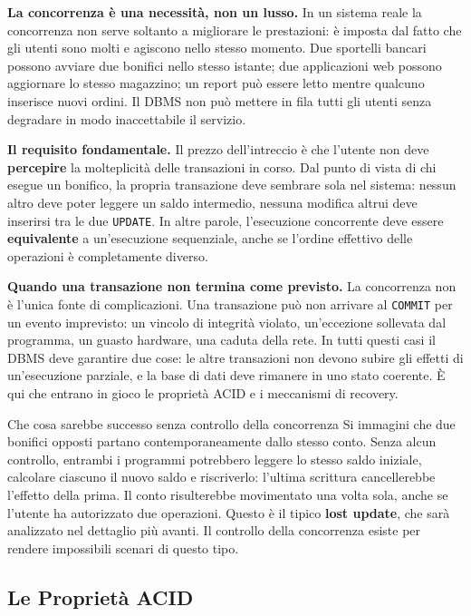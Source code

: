 \documentclass[12pt]{extarticle}
\begin{document}
\medskip
\noindent \textbf{La concorrenza è una necessità, non un lusso.} In un sistema reale la concorrenza non serve soltanto a migliorare le prestazioni: è imposta dal fatto che gli utenti sono molti e agiscono nello stesso momento. Due sportelli bancari possono avviare due bonifici nello stesso istante; due applicazioni web possono aggiornare lo stesso magazzino; un report può essere letto mentre qualcuno inserisce nuovi ordini. Il DBMS non può mettere in fila tutti gli utenti senza degradare in modo inaccettabile il servizio.

\medskip
\noindent \textbf{Il requisito fondamentale.} Il prezzo dell'intreccio è che l'utente non deve \textbf{percepire} la molteplicità delle transazioni in corso. Dal punto di vista di chi esegue un bonifico, la propria transazione deve sembrare sola nel sistema: nessun altro deve poter leggere un saldo intermedio, nessuna modifica altrui deve inserirsi tra le due \texttt{UPDATE}. In altre parole, l'esecuzione concorrente deve essere \textbf{equivalente} a un'esecuzione sequenziale, anche se l'ordine effettivo delle operazioni è completamente diverso.

\medskip
\noindent \textbf{Quando una transazione non termina come previsto.} La concorrenza non è l'unica fonte di complicazioni. Una transazione può non arrivare al \texttt{COMMIT} per un evento imprevisto: un vincolo di integrità violato, un'eccezione sollevata dal programma, un guasto hardware, una caduta della rete. In tutti questi casi il DBMS deve garantire due cose: le altre transazioni non devono subire gli effetti di un'esecuzione parziale, e la base di dati deve rimanere in uno stato coerente. È qui che entrano in gioco le proprietà ACID e i meccanismi di recovery.

\begin{cbox}{Che cosa sarebbe successo senza controllo della concorrenza}
\noindent Si immagini che due bonifici opposti partano contemporaneamente dallo stesso conto. Senza alcun controllo, entrambi i programmi potrebbero leggere lo stesso saldo iniziale, calcolare ciascuno il nuovo saldo e riscriverlo: l'ultima scrittura cancellerebbe l'effetto della prima. Il conto risulterebbe movimentato una volta sola, anche se l'utente ha autorizzato due operazioni. Questo è il tipico \textbf{lost update}, che sarà analizzato nel dettaglio più avanti. Il controllo della concorrenza esiste per rendere impossibili scenari di questo tipo.
\end{cbox}

\subsection{Le Proprietà ACID}
\end{document}
